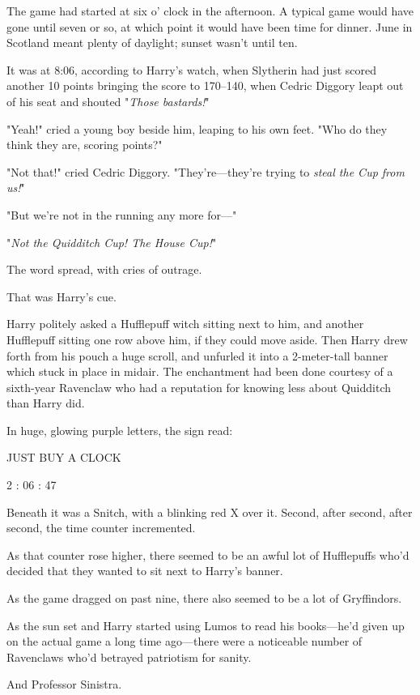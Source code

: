 The game had started at six o' clock in the afternoon. A typical game would
have gone until seven or so, at which point it would have been time for dinner.
June in Scotland meant plenty of daylight; sunset wasn't until ten.

It was at 8:06\PM , according to Harry's watch, when Slytherin
had just scored another 10 points bringing the score to 170--{140}, when Cedric
Diggory leapt out of his seat and shouted "\emph{Those bastards!}"

"Yeah!" cried a young boy beside him, leaping to his own feet. "Who do they
think they are, scoring points?"

"Not that!" cried Cedric Diggory. "They're---they're trying to \emph{steal the
Cup from us!}"

"But we're not in the running any more for\mbox{---}"

"\emph{Not the Quidditch Cup! The House Cup!}"

The word spread, with cries of outrage.

That was Harry's cue.

Harry politely asked a Hufflepuff witch sitting next to him, and another
Hufflepuff sitting one row above him, if they could move aside. Then Harry drew
forth from his pouch a huge scroll, and unfurled it into a 2-meter-tall banner
which stuck in place in midair. The enchantment had been done courtesy of a
sixth-year Ravenclaw who had a reputation for knowing less about Quidditch than
Harry did.

In huge, glowing purple letters, the sign read:

\begin{center}
JUST BUY A CLOCK

2 : 06 : 47
\end{center}

Beneath it was a Snitch, with a blinking red X over it.
\sbreak
Second, after second, after second, the time counter incremented.

As that counter rose higher, there seemed to be an awful lot of Hufflepuffs
who'd decided that they wanted to sit next to Harry's banner.

As the game dragged on past nine, there also seemed to be a lot of Gryffindors.

As the sun set and Harry started using Lumos to read his books---he'd given up
on the actual game a long time ago---there were a noticeable number of
Ravenclaws who'd betrayed patriotism for sanity.

And Professor Sinistra.

